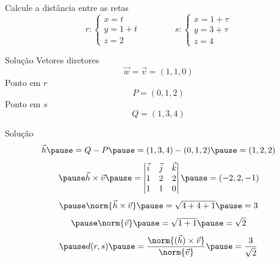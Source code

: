 \begin{question}
  Calcule a distância entre as retas
  \[
    r\colon
    \begin{cases}
      x = t   \\
      y = 1+t \\
      z = 2
    \end{cases}
  \qquad\qquad
    s\colon
    \begin{cases}
      x = 1+\tau \\
      y = 3+\tau \\
      z = 4
    \end{cases}
  \]
\end{question}

\begin{resolution}{Solução}
  Vetores diretores
  \[
    \vec{w} = \vec{v} = (1, 1, 0)
  \]
  \pause
  Ponto em $r$
  \[
    P = ( 0, 1, 2)
  \]
  \pause
  Ponto em $s$
  \[
    Q = (1, 3, 4)
  \]
\end{resolution}

\begin{resolution}{Solução}
  \[
    \vec{h}
    \pause
    = Q - P
    \pause
    = (1, 3, 4) - ( 0, 1, 2)
    \pause
    = (1, 2, 2)
  \]
  \[
    \pause
    \vec{h}\times\vec{v}
    \pause
    = \begin{vmatrix}
      \vec{i} & \vec{j} & \vec{k} \\
      1       & 2       & 2       \\
      1       & 1       & 0
    \end{vmatrix}
    \pause
    = (-2, 2, -1)
  \]
  \[
    \pause
    \norm{\vec{h}\times\vec{v}}
    \pause
    = \sqrt{4+4+1}
    \pause
    = 3
  \]
  \[
    \pause
    \norm{\vec{v}}
    \pause
    = \sqrt{1+1}
    \pause
    = \sqrt{2}
  \]
  \[
    \pause
    d(r, s)
    \pause
    = \frac{\norm{(\vec{h})\times\vec v}}{\norm{\vec{v}}}
    \pause
    = \frac{3}{\sqrt{2}}
  \]
\end{resolution}

\endinput

